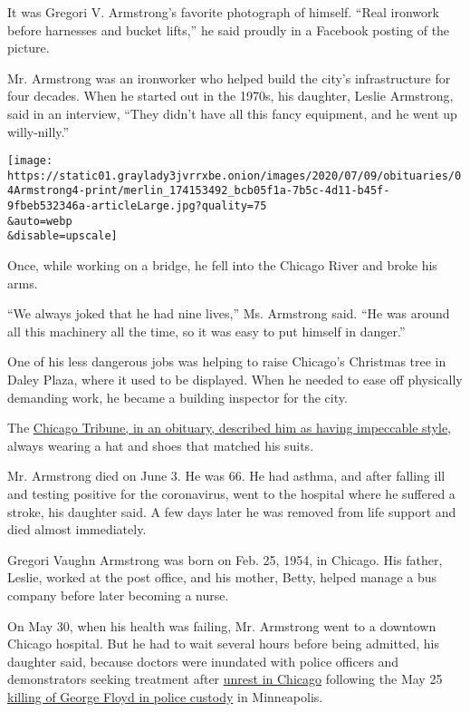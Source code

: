 It was Gregori V. Armstrong's favorite photograph of himself. ``Real
ironwork before harnesses and bucket lifts,'' he said proudly in a
Facebook posting of the picture.

Mr. Armstrong was an ironworker who helped build the city's
infrastructure for four decades. When he started out in the 1970s, his
daughter, Leslie Armstrong, said in an interview, ``They didn't have all
this fancy equipment, and he went up willy-nilly.''

\texttt{[image: https://static01.graylady3jvrrxbe.onion/images/2020/07/09/obituaries/04Armstrong4-print/merlin\_174153492\_bcb05f1a-7b5c-4d11-b45f-9fbeb532346a-articleLarge.jpg?quality=75\\\&auto=webp\\\&disable=upscale]}

Once, while working on a bridge, he fell into the Chicago River and
broke his arms.

``We always joked that he had nine lives,'' Ms. Armstrong said. ``He was
around all this machinery all the time, so it was easy to put himself in
danger.''

One of his less dangerous jobs was helping to raise Chicago's Christmas
tree in Daley Plaza, where it used to be displayed. When he needed to
ease off physically demanding work, he became a building inspector for
the city.

The
\href{https://graphics.chicagotribune.com/coronavirus-lives-lost/blurb.html}{Chicago
Tribune, in an obituary, described him as having impeccable style},
always wearing a hat and shoes that matched his suits.

Mr. Armstrong died on June 3. He was 66. He had asthma, and after
falling ill and testing positive for the coronavirus, went to the
hospital where he suffered a stroke, his daughter said. A few days later
he was removed from life support and died almost immediately.

Gregori Vaughn Armstrong was born on Feb. 25, 1954, in Chicago. His
father, Leslie, worked at the post office, and his mother, Betty, helped
manage a bus company before later becoming a nurse.

On May 30, when his health was failing, Mr. Armstrong went to a downtown
Chicago hospital. But he had to wait several hours before being
admitted, his daughter said, because doctors were inundated with police
officers and demonstrators seeking treatment after
\href{https://news.wttw.com/2020/06/29/371-complaints-lodged-about-chicago-police-response-protests}{unrest
in Chicago} following the May 25
\href{https://www.nytimes3xbfgragh.onion/video/us/100000007159353/george-floyd-arrest-death-video.html}{killing
of George Floyd in police custody} in Minneapolis.

